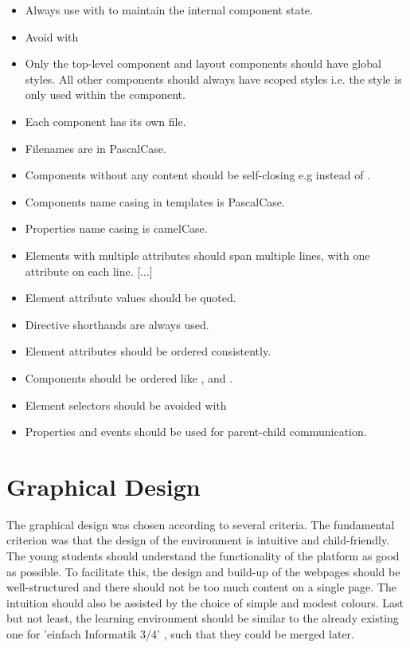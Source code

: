 \begin{itemize}
    \item Always use  with  to maintain the internal component state.
    \item Avoid  with 
    \item Only the top-level  component and layout components should have global styles. All other components should always have scoped styles i.e. the style is only used within the component.
    \item Each component has its own file.
    \item Filenames are in PascalCase.
    \item Components without any content should be self-closing e.g  instead of .
    \item Components name casing in templates is PascalCase.
    \item Properties name casing is camelCase.
    \item Elements with multiple attributes should span multiple lines, with one attribute on each line. [...]
    \item Element attribute values should be quoted.
    \item Directive shorthands are always used.
    \item Element attributes should be ordered consistently.
    \item Components should be ordered like ,  and .
    \item Element selectors should be avoided with 
    \item Properties and events should be used for parent-child communication.\cite{FBWT}
\end{itemize}

\section{Graphical Design}
The graphical design was chosen according to several criteria.
The fundamental criterion was that the design of the environment is intuitive and child-friendly. The young students should understand the functionality of the platform as good as possible. To facilitate this, the design and build-up of the webpages should be well-structured and there should not be too much content on a single page. The intuition should also be assisted by the choice of simple and modest colours. Last but not least, the learning environment should be similar to the already existing one for 'einfach Informatik 3/4' \cite{FBWT}, such that they could be merged later. 
